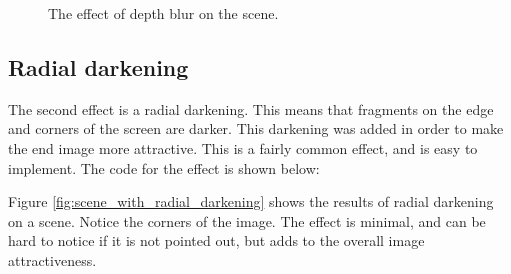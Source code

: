 \documentclass{article}
\begin{document}
\begin{figure}[h]
	\centering
	\hspace{1em}
	\caption{The effect of depth blur on the scene.}
	\label{fig:scene_with_blur}
\end{figure}

\vspace{-1em}

\subsection{Radial darkening}
The second effect is a radial darkening. This means that fragments on the edge and corners of the screen are darker. This darkening was added in order to make the end image more attractive. This is a fairly common effect, and is easy to implement. The code for the effect is shown below:


\medskip \par
\noindent
Figure \ref{fig:scene_with_radial_darkening} shows the results of radial darkening on a scene. Notice the corners of the image. The effect is minimal, and can be hard to notice if it is not pointed out, but adds to the overall image attractiveness.
\end{document}
